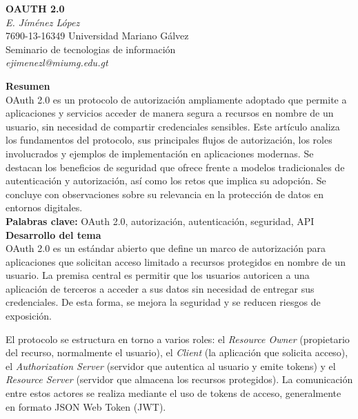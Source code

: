 \documentclass[12pt,letterpaper]{article}
\begin{document}

\begin{center}
\textbf{OAUTH 2.0} \\
\textit{E. Jíménez López} \\
7690-13-16349 Universidad Mariano Gálvez \\
Seminario de tecnologias de información \\
\textit{ejimenezl@miumg.edu.gt} \\
\end{center}

\textbf{Resumen} \\
OAuth 2.0 es un protocolo de autorización ampliamente adoptado que permite a aplicaciones y servicios acceder de manera segura a recursos en nombre de un usuario, sin necesidad de compartir credenciales sensibles. Este artículo analiza los fundamentos del protocolo, sus principales flujos de autorización, los roles involucrados y ejemplos de implementación en aplicaciones modernas. Se destacan los beneficios de seguridad que ofrece frente a modelos tradicionales de autenticación y autorización, así como los retos que implica su adopción. Se concluye con observaciones sobre su relevancia en la protección de datos en entornos digitales. \\

\textbf{Palabras clave:} OAuth 2.0, autorización, autenticación, seguridad, API \\

\textbf{Desarrollo del tema} \\
OAuth 2.0 es un estándar abierto que define un marco de autorización para aplicaciones que solicitan acceso limitado a recursos protegidos en nombre de un usuario. La premisa central es permitir que los usuarios autoricen a una aplicación de terceros a acceder a sus datos sin necesidad de entregar sus credenciales. De esta forma, se mejora la seguridad y se reducen riesgos de exposición. 

El protocolo se estructura en torno a varios roles: el \textit{Resource Owner} (propietario del recurso, normalmente el usuario), el \textit{Client} (la aplicación que solicita acceso), el \textit{Authorization Server} (servidor que autentica al usuario y emite tokens) y el \textit{Resource Server} (servidor que almacena los recursos protegidos). La comunicación entre estos actores se realiza mediante el uso de tokens de acceso, generalmente en formato JSON Web Token (JWT). 
\end{document}
